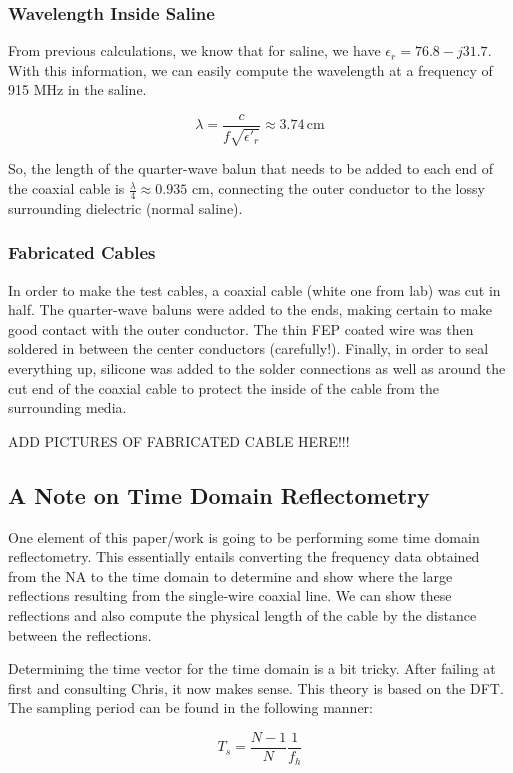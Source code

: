 \documentclass[12pt,onecolumn,titlepage]{article}
\begin{document}
\subsubsection{Wavelength Inside Saline}
\indent \indent From previous calculations, we know that for saline, we have $\epsilon_r = 76.8 - j 31.7$. With this information, we can easily compute the wavelength at a frequency of 915 MHz in the saline. 

\[ \lambda = \frac{c}{f \sqrt{\epsilon'_r}} \approx 3.74 \, \text{cm} \]

So, the length of the quarter-wave balun that needs to be added to each end of the coaxial cable is $\frac{\lambda}{4} \approx 0.935$ cm, connecting the outer conductor to the lossy surrounding dielectric (normal saline).


\subsubsection{Fabricated Cables}
\indent \indent In order to make the test cables, a coaxial cable (white one from lab) was cut in half. The quarter-wave baluns were added to the ends, making certain to make good contact with the outer conductor. The thin FEP coated wire was then soldered in between the center conductors (carefully!). Finally, in order to seal everything up, silicone was added to the solder connections as well as around the cut end of the coaxial cable to protect the inside of the cable from the surrounding media.

ADD PICTURES OF FABRICATED CABLE HERE!!!

\subsection{A Note on Time Domain Reflectometry}
\indent \indent One element of this paper/work is going to be performing some time domain reflectometry. This essentially entails converting the frequency data obtained from the NA to the time domain to determine and show where the large reflections resulting from the single-wire coaxial line. We can show these reflections and also compute the physical length of the cable by the distance between the reflections.

Determining the time vector for the time domain is a bit tricky. After failing at first and consulting Chris, it now makes sense. This theory is based on the DFT. The sampling period can be found in the following manner:

\[ T_s = \frac{N-1}{N} \frac{1}{f_h} \]
\end{document}
